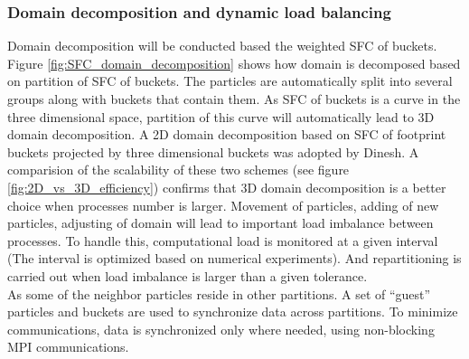 \documentclass[conference,compsoc]{IEEEtran}
\begin{document}
\subsubsection{Domain decomposition and dynamic load balancing}
Domain decomposition will be conducted based the weighted SFC of buckets. Figure \ref{fig:SFC_domain_decomposition} shows how domain is decomposed based on partition of SFC of buckets. The particles are automatically split into several groups along with buckets that contain them. As SFC of buckets is a curve in the three dimensional space, partition of this curve will automatically lead to 3D domain decomposition. A 2D domain decomposition based on SFC of footprint buckets projected by three dimensional buckets was adopted by Dinesh\cite{kumar2013parallel}. A comparision of the scalability of these two schemes (see figure \ref{fig:2D_vs_3D_efficiency}) confirms that 3D domain decomposition is a better choice when processes number is larger. 
Movement of particles, adding of new particles, adjusting of domain will lead to important load imbalance between processes. To handle this, computational load is monitored at a given interval (The interval is optimized based on numerical experiments). And repartitioning is carried out when load imbalance is larger than a given tolerance.
\\
As some of the neighbor particles reside in other
partitions. A set of “guest” particles and buckets are used to synchronize data across partitions. To minimize communications, data is synchronized only where needed, using non-blocking MPI communications. 
\end{document}
